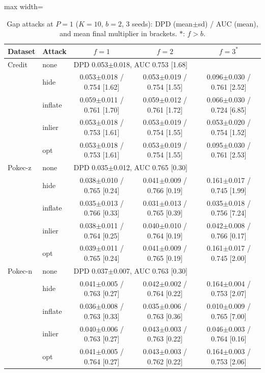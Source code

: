 \begin{table}[tbp]
\centering
\scriptsize
\setlength{\tabcolsep}{3pt}
\caption{Gap attacks at $P=1$ ($K=10$, $b=2$, 3 seeds): DPD (mean$\pm$sd) / AUC (mean), and mean final multiplier in brackets. $\ast$: $f>b$.}
\label{tab:s_e8}
\begin{adjustbox}{max width=\textwidth}
\begin{tabular}{llccc}
\toprule
Dataset & Attack & $f=1$ & $f=2$ & $f=3^\ast$ \\
\midrule
Credit & none & \multicolumn{3}{l}{DPD 0.053$\pm$0.018, AUC 0.753 [1.68]} \\
 & hide & 0.053$\pm$0.018 / 0.754 [1.62] & 0.053$\pm$0.019 / 0.754 [1.55] & 0.096$\pm$0.030 / 0.761 [2.52] \\
 & inflate & 0.059$\pm$0.011 / 0.761 [1.70] & 0.059$\pm$0.012 / 0.761 [1.72] & 0.066$\pm$0.030 / 0.724 [6.85] \\
 & inlier & 0.053$\pm$0.018 / 0.753 [1.61] & 0.053$\pm$0.019 / 0.754 [1.55] & 0.053$\pm$0.020 / 0.754 [1.52] \\
 & opt & 0.053$\pm$0.018 / 0.753 [1.61] & 0.053$\pm$0.019 / 0.754 [1.55] & 0.095$\pm$0.030 / 0.761 [2.53] \\
\midrule
Pokec-z & none & \multicolumn{3}{l}{DPD 0.035$\pm$0.012, AUC 0.765 [0.30]} \\
 & hide & 0.038$\pm$0.010 / 0.765 [0.24] & 0.041$\pm$0.009 / 0.766 [0.19] & 0.161$\pm$0.017 / 0.745 [1.99] \\
 & inflate & 0.035$\pm$0.013 / 0.766 [0.33] & 0.031$\pm$0.013 / 0.765 [0.39] & 0.035$\pm$0.018 / 0.756 [7.24] \\
 & inlier & 0.038$\pm$0.011 / 0.764 [0.25] & 0.040$\pm$0.010 / 0.764 [0.19] & 0.042$\pm$0.008 / 0.766 [0.17] \\
 & opt & 0.039$\pm$0.011 / 0.765 [0.24] & 0.041$\pm$0.009 / 0.765 [0.19] & 0.161$\pm$0.017 / 0.745 [2.00] \\
\midrule
Pokec-n & none & \multicolumn{3}{l}{DPD 0.037$\pm$0.007, AUC 0.763 [0.30]} \\
 & hide & 0.041$\pm$0.005 / 0.763 [0.27] & 0.042$\pm$0.002 / 0.764 [0.22] & 0.164$\pm$0.004 / 0.753 [2.07] \\
 & inflate & 0.036$\pm$0.008 / 0.763 [0.33] & 0.035$\pm$0.006 / 0.763 [0.36] & 0.010$\pm$0.009 / 0.765 [7.00] \\
 & inlier & 0.040$\pm$0.006 / 0.763 [0.27] & 0.043$\pm$0.003 / 0.763 [0.22] & 0.046$\pm$0.003 / 0.764 [0.16] \\
 & opt & 0.041$\pm$0.005 / 0.764 [0.27] & 0.043$\pm$0.003 / 0.762 [0.22] & 0.164$\pm$0.003 / 0.753 [2.06] \\
\bottomrule
\end{tabular}
\end{adjustbox}
\end{table}
